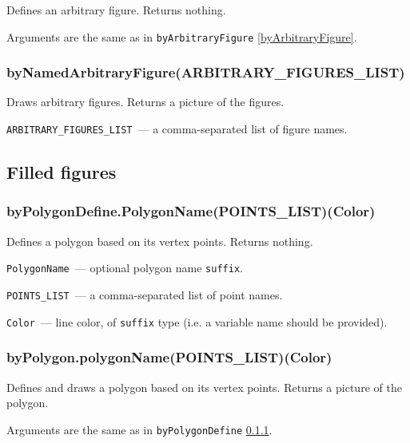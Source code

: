 	Defines an arbitrary figure. Returns nothing.
	
	Arguments are the same as in \texttt{byArbitraryFigure} \ref{byArbitraryFigure}.

\subsubsection{byNamedArbitraryFigure(ARBITRARY\_FIGURES\_LIST)}\label{byNamedArbitraryFigure}

	Draws arbitrary figures. Returns a picture of the figures.
	
	\texttt{ARBITRARY\_FIGURES\_LIST}~— a comma-separated list of figure names.


\subsection{Filled figures}


\subsubsection{byPolygonDefine.PolygonName(POINTS\_LIST)(Color)}\label{byPolygonDefine}

	Defines a polygon based on its vertex points. Returns nothing.
	
	\texttt{PolygonName}~— optional polygon name \texttt{suffix}.
	
	\texttt{POINTS\_LIST}~— a comma-separated list of point names.
	
	\texttt{Color}~— line color, of \texttt{suffix} type (i.e. a variable name should be provided).


\subsubsection{byPolygon.polygonName(POINTS\_LIST)(Color)}\label{byPolygon}

	Defines and draws a polygon based on its vertex points. Returns a picture of the polygon.
	
	Arguments are the same as in \texttt{byPolygonDefine} \ref{byPolygonDefine}.


